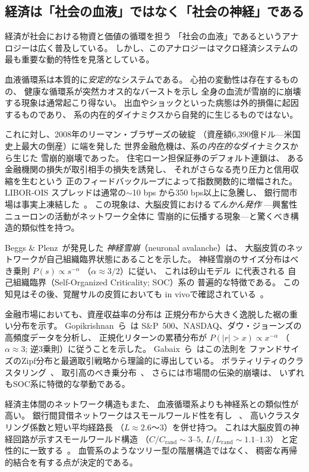 \documentclass[12pt,twocolumn]{ltjsarticle}
\begin{document}
\subsection{経済は「社会の血液」ではなく「社会の神経」である}

経済が社会における物資と価値の循環を担う
「社会の血液」であるというアナロジーは広く普及している。
しかし、このアナロジーはマクロ経済システムの
最も重要な動的特性を見落としている。

血液循環系は本質的に\emph{安定的}なシステムである。
心拍の変動性は存在するものの、
健康な循環系が突然カオス的なバーストを示し
全身の血流が雪崩的に崩壊する現象は通常起こり得ない。
出血やショックといった病態は外的損傷に起因するものであり、
系の内在的ダイナミクスから自発的に生じるものではない。

これに対し、2008年のリーマン・ブラザーズの破綻
（資産額6,390億ドル---米国史上最大の倒産）に端を発した
世界金融危機は、系の\emph{内在的な}ダイナミクスから生じた
雪崩的崩壊であった。
住宅ローン担保証券のデフォルト連鎖は、
ある金融機関の損失が取引相手の損失を誘発し、
それがさらなる売り圧力と信用収縮を生むという
正のフィードバックループによって指数関数的に増幅された。
LIBOR-OIS スプレッドは通常の$\sim$10 bps から350 bps以上に急騰し、
銀行間市場は事実上凍結した~\cite{Gorton2008}。
この現象は、大脳皮質における\emph{てんかん発作}
---興奮性ニューロンの活動がネットワーク全体に
雪崩的に伝播する現象---と驚くべき構造的類似性を持つ。

Beggs \& Plenz~\cite{Beggs2003}が発見した
\emph{神経雪崩}（neuronal avalanche）は、
大脳皮質のネットワークが自己組織臨界状態にあることを示した。
神経雪崩のサイズ分布はべき乗則 $P(s) \propto s^{-\alpha}$
（$\alpha \approx 3/2$）に従い、
これは砂山モデル~\cite{Bak1987}に代表される
自己組織臨界（Self-Organized Criticality; SOC）系の
普遍的な特徴である。
この知見はその後、覚醒サルの皮質においても
in vivoで確認されている~\cite{Petermann2009}。

金融市場においても、資産収益率の分布は
正規分布から大きく逸脱した裾の重い分布を示す。
Gopikrishnan~ら~\cite{Gopikrishnan1999}は
S\&P~500、NASDAQ、ダウ・ジョーンズの高頻度データを分析し、
正規化リターンの累積分布が
$P(|r| > x) \propto x^{-\alpha}$
（$\alpha \approx 3$; 逆3乗則）に従うことを示した。
Gabaix~ら~\cite{Gabaix2003}はこの法則を
ファンドサイズのZipf分布と最適取引戦略から理論的に導出している。
ボラティリティのクラスタリング~\cite{Cont2001}、
取引高のべき乗分布~\cite{Gopikrishnan2000}、
さらには市場間の伝染的崩壊は、
いずれもSOC系に特徴的な挙動である。

経済主体間のネットワーク構造もまた、
血液循環系よりも神経系との類似性が高い。
銀行間貸借ネットワークはスモールワールド性を有し
~\cite{Boss2004}、
高いクラスタリング係数と短い平均経路長
（$L \approx 2.6$〜$3$）を併せ持つ。
これは大脳皮質の神経回路が示すスモールワールド構造
（$C/C_{\text{rand}} \sim 3$--$5$, $L/L_{\text{rand}} \sim 1.1$--$1.3$）
と定性的に一致する~\cite{Bassett2006}。
血管系のようなツリー型の階層構造ではなく、
稠密な再帰的結合を有する点が決定的である。
\end{document}
